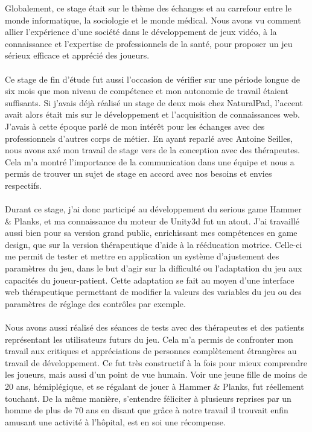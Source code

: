 Globalement, ce stage était sur le thème des échanges et au carrefour entre le monde informatique, la sociologie et le monde médical. Nous avons vu comment allier l'expérience d'une société dans le développement de jeux vidéo, à la connaissance et l'expertise de professionnels de la santé, pour proposer un jeu sérieux efficace et apprécié des joueurs.

\paragraph{}
Ce stage de fin d'étude fut aussi l'occasion de vérifier sur une période longue de six mois que mon niveau de compétence et mon autonomie de travail étaient suffisants. Si j'avais déjà réalisé un stage de deux mois chez NaturalPad, l'accent avait alors était mis sur le développement et l'acquisition de connaissances web. J'avais à cette époque parlé de mon intérêt pour les échanges avec des professionnels d'autres corps de métier. En ayant reparlé avec Antoine Seilles, nous avons axé mon travail de stage vers de la conception avec des thérapeutes. Cela m'a montré l'importance de la communication dans une équipe et nous a permis de trouver un sujet de stage en accord avec nos besoins et envies respectifs.

\paragraph{}
Durant ce stage, j'ai donc participé au développement du serious game Hammer \& Planks, et ma connaissance du moteur de Unity3d fut un atout. J'ai travaillé aussi bien pour sa version grand public, enrichissant mes compétences en game design, que sur la version thérapeutique d'aide à la rééducation motrice. Celle-ci me permit de tester et mettre en application un système d'ajustement des paramètres du jeu, dans le but d'agir sur la difficulté ou l'adaptation du jeu aux capacités du joueur-patient. Cette adaptation se fait au moyen d'une interface web thérapeutique permettant de modifier la valeurs des variables du jeu ou des paramètres de réglage des contrôles par exemple.

\paragraph{}
Nous avons aussi réalisé des séances de tests avec des thérapeutes et des patients représentant les utilisateurs futurs du jeu. Cela m'a permis de confronter mon travail aux critiques et appréciations de personnes complètement étrangères au travail de développement. Ce fut très constructif à la fois pour mieux comprendre les joueurs, mais aussi d'un point de vue humain. Voir une jeune fille de moins de 20 ans, hémiplégique, et se régalant de jouer à Hammer \& Planks, fut réellement touchant. De la même manière, s'entendre féliciter à plusieurs reprises par un homme de plus de 70 ans en disant que grâce à notre travail il trouvait enfin amusant une activité à l'hôpital, est en soi une récompense.

